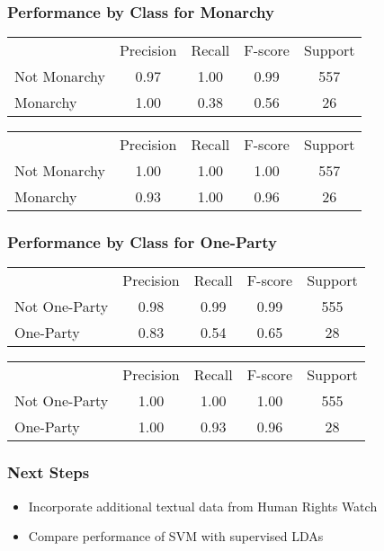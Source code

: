 \documentclass{beamer}
\begin{document}
\begin{frame}
\frametitle{Performance by Class for Monarchy}

\begin{table}[ht]
\centering
\begin{tabular}{lcccc}
\hline\hline
~& Precision & Recall & F-score & Support \\
Not Monarchy & 0.97 & 1.00 & 0.99 & 557 \\
Monarchy & 1.00 & 0.38 & 0.56 & 26
\end{tabular}
\end{table}

\begin{table}[ht]
\centering
\begin{tabular}{lcccc}
\hline\hline
~& Precision & Recall & F-score & Support \\
Not Monarchy & 1.00 & 1.00 & 1.00 & 557 \\
Monarchy & 0.93 & 1.00 & 0.96 & 26
\end{tabular}
\end{table}

\end{frame}

\begin{frame}
\frametitle{Performance by Class for One-Party}

\begin{table}[ht]
\centering
\begin{tabular}{lcccc}
\hline\hline
~& Precision & Recall & F-score & Support \\
Not One-Party & 0.98 & 0.99 & 0.99 & 555 \\
One-Party & 0.83 & 0.54 & 0.65 & 28
\end{tabular}
\end{table}

\begin{table}[ht]
\centering
\begin{tabular}{lcccc}
\hline\hline
~& Precision & Recall & F-score & Support \\
Not One-Party & 1.00 & 1.00 & 1.00 & 555 \\
One-Party & 1.00 & 0.93 & 0.96 & 28
\end{tabular}
\end{table}

\end{frame}

\begin{frame}
\frametitle{Next Steps}

\begin{itemize}
	\item Incorporate additional textual data from Human Rights Watch
	\item Compare performance of SVM with supervised LDAs
\end{itemize}

\end{frame}

\end{document}
